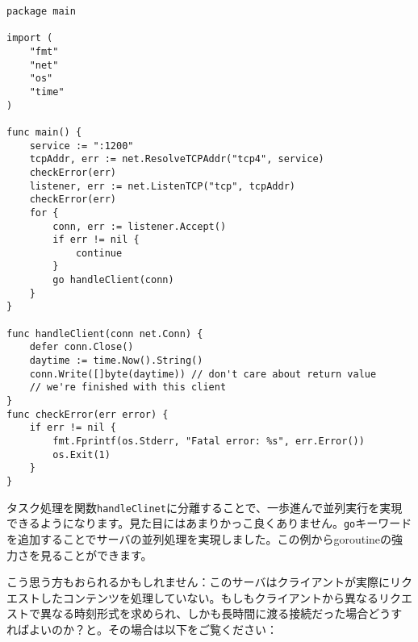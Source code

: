 \begin{lstlisting}[numbers=none]
package main

import (
    "fmt"
    "net"
    "os"
    "time"
)

func main() {
    service := ":1200"
    tcpAddr, err := net.ResolveTCPAddr("tcp4", service)
    checkError(err)
    listener, err := net.ListenTCP("tcp", tcpAddr)
    checkError(err)
    for {
        conn, err := listener.Accept()
        if err != nil {
            continue
        }
        go handleClient(conn)
    }
}

func handleClient(conn net.Conn) {
    defer conn.Close()
    daytime := time.Now().String()
    conn.Write([]byte(daytime)) // don't care about return value
    // we're finished with this client
}
func checkError(err error) {
    if err != nil {
        fmt.Fprintf(os.Stderr, "Fatal error: %s", err.Error())
        os.Exit(1)
    }
}
\end{lstlisting}

タスク処理を関数\texttt{handleClinet}に分離することで、一歩進んで並列実行を実現できるようになります。見た目にはあまりかっこ良くありません。\texttt{go}キーワードを追加することでサーバの並列処理を実現しました。この例からgoroutineの強力さを見ることができます。

こう思う方もおられるかもしれません：このサーバはクライアントが実際にリクエストしたコンテンツを処理していない。もしもクライアントから異なるリクエストで異なる時刻形式を求められ、しかも長時間に渡る接続だった場合どうすればよいのか？と。その場合は以下をご覧ください：



